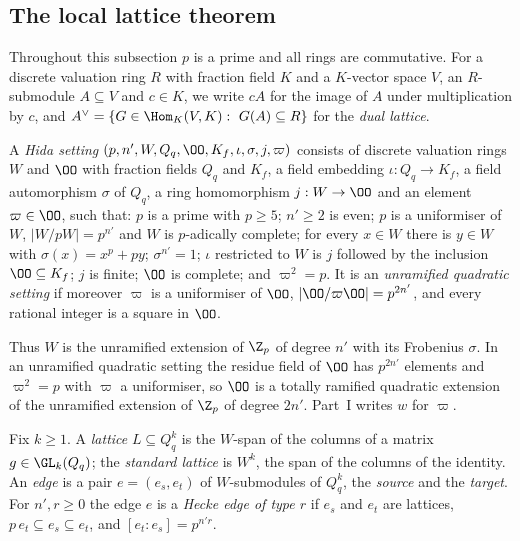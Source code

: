 \subsection{The local lattice theorem}\label{sec:pf:linkG:local}

Throughout this subsection $p$ is a prime and all rings are commutative. For a discrete valuation ring $R$ with
fraction field $K$ and a $K$-vector space $V$, an $R$-submodule $A\subseteq V$ and $c\in K$, we write $cA$ for the
image of $A$ under multiplication by $c$, and $A^\vee=\{G\in\Hom_K(V,K):\ G(A)\subseteq R\}$ for the \emph{dual
lattice}.

\begin{definition}\label{pf:linkG:hida}
A \emph{Hida setting} $(p,n',W,Q_q,\OO,K_f,\iota,\sigma,j,\varpi)$ consists of discrete valuation rings $W$ and
$\OO$ with fraction fields $Q_q$ and $K_f$, a field embedding $\iota:Q_q\to K_f$, a field automorphism $\sigma$ of
$Q_q$, a ring homomorphism $j:W\to\OO$ and an element $\varpi\in\OO$, such that: $p$ is a prime with $p\ge5$;
$n'\ge2$ is even; $p$ is a uniformiser of $W$, $|W/pW|=p^{n'}$ and $W$ is $p$-adically complete; for every
$x\in W$ there is $y\in W$ with $\sigma(x)=x^p+py$; $\sigma^{n'}=1$; $\iota$ restricted to $W$ is $j$ followed by
the inclusion $\OO\subseteq K_f$; $j$ is finite; $\OO$ is complete; and $\varpi^2=p$. It is an \emph{unramified
quadratic setting} if moreover $\varpi$ is a uniformiser of $\OO$, $|\OO/\varpi\OO|=p^{2n'}$, and every rational
integer is a square in $\OO$.
\end{definition}

Thus $W$ is the unramified extension of $\Z_p$ of degree $n'$ with its Frobenius $\sigma$. In an unramified quadratic
setting the residue field of $\OO$ has $p^{2n'}$ elements and $\varpi^2=p$ with $\varpi$ a uniformiser, so $\OO$ is a
totally ramified quadratic extension of the unramified extension of $\Z_p$ of degree $2n'$. Part~I writes $w$ for
$\varpi$.

\begin{definition}\label{pf:linkG:edges}
Fix $k\ge1$. A \emph{lattice} $L\subseteq Q_q^k$ is the $W$-span of the columns of a matrix $g\in\GL_k(Q_q)$;
the \emph{standard lattice} is $W^k$, the span of the columns of the identity. An \emph{edge} is a pair
$e=(e_s,e_t)$ of $W$-submodules of $Q_q^k$, the \emph{source} and the \emph{target}. For $n',r\ge0$ the edge $e$
is a \emph{Hecke edge of type $r$} if $e_s$ and $e_t$ are lattices, $p\,e_t\subseteq e_s\subseteq e_t$, and
$[e_t:e_s]=p^{n'r}$.
\end{definition}

